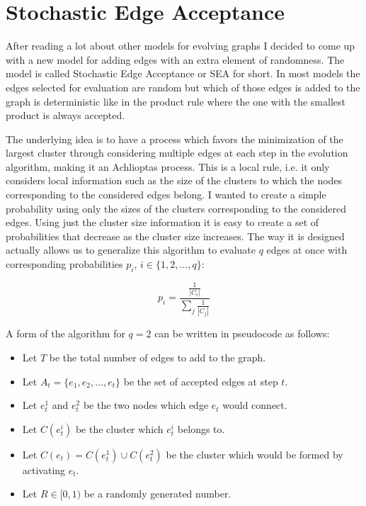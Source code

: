 \section{Stochastic Edge Acceptance}
After reading a lot about other models for evolving graphs I decided to come up with a new model for adding edges with an extra element of randomness.
The model is called Stochastic Edge Acceptance or SEA for short.
In most models the edges selected for evaluation are random but which of those edges is added to the graph is deterministic like in the product rule where the one with the smallest product is always accepted.

The underlying idea is to have a process which favors the minimization of the largest cluster through considering multiple edges at each step in the evolution algorithm, making it an Achlioptas process.
This is a local rule, i.e. it only considers local information such as the size of the clusters to which the nodes corresponding to the considered edges belong.
I wanted to create a simple probability using only the sizes of the clusters corresponding to the considered edges.
Using just the cluster size information it is easy to create a set of probabilities that decrease as the cluster size increases.
The way it is designed actually allows us to generalize this algorithm to evaluate $q$ edges at once with corresponding probabilities $p_i$, $i \in \{1, 2, ..., q\}$:

\begin{equation}
	p_i = \frac{\frac{1}{|C_i|}}{\sum_j \frac{1}{|C_j|}}
\end{equation}

A form of the algorithm for $q = 2$ can be written in pseudocode as follows:
\begin{itemize}
	\item Let $T$ be the total number of edges to add to the graph.
	\item Let $A_t = \{e_1, e_2, ..., e_t\}$ be the set of accepted edges at step $t$.
	\item Let $e_t^1$ and $e_t^2$ be the two nodes which edge $e_t$ would connect.
	\item Let $C(e_t^i)$ be the cluster which $e_t^i$ belongs to.
	\item Let $C(e_t) = C(e_t^1) \cup C(e_t^2)$ be the cluster which would be formed by activating $e_t$.
	\item Let $R \in [0, 1)$ be a randomly generated number.
\end{itemize}

